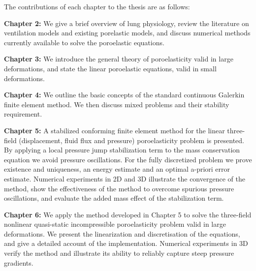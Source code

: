 The contributions of each chapter to the thesis are as follows:\newline

\noindent \textbf{Chapter 2:} We give a brief overview of lung physiology, review the literature on ventilation models and existing porelastic models, and discuss numerical methods currently available to solve the poroelastic equations.\newline

\noindent \textbf{Chapter 3:} We introduce the general theory of poroelasticity valid in large deformations, and state the linear poroelastic equations, valid in small deformations.\newline

\noindent \textbf{Chapter 4:} We
outline the basic concepts of the standard
continuous Galerkin finite element method. We then discuss mixed problems and their stability requirement.
\newline

\noindent \textbf{Chapter 5:} A stabilized conforming finite element method for the linear three-field (displacement, fluid flux and pressure) poroelasticity problem is presented. By applying a local pressure jump stabilization term to the mass conservation equation we avoid pressure oscillations. For the fully discretized problem we prove existence and uniqueness, an energy estimate and an optimal a-priori error estimate. Numerical experiments in 2D and 3D illustrate the convergence of the method, show the effectiveness of the method to overcome spurious pressure oscillations, and evaluate the added mass effect of the stabilization term.
\newline
%

\noindent \textbf{Chapter 6:} We apply the method developed in Chapter 5 to solve the three-field nonlinear quasi-static incompressible poroelasticity problem valid in large deformations. We present the linearization and discretisation of the equations, and give a detailed account of the implementation. Numerical experiments in 3D verify the method and illustrate its ability to reliably capture steep pressure gradients.
\newline

